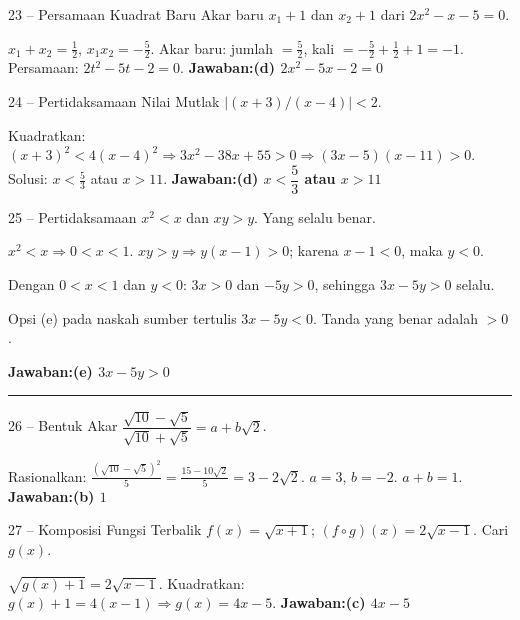 \documentclass[11pt]{article}
\newcommand{\jawaban}[1]{\textbf{Jawaban:}\enspace\colorbox{gold!30}{\textbf{#1}}}
\begin{document}
\begin{soal}{23 -- Persamaan Kuadrat Baru}
Akar baru $x_1+1$ dan $x_2+1$ dari $2x^2-x-5=0$.
\end{soal}
\begin{pembox}
$x_1+x_2=\frac12$, $x_1x_2=-\frac52$. Akar baru: jumlah $=\frac52$, kali $=-\frac52+\frac12+1=-1$.
Persamaan: $2t^2-5t-2=0$.
\jawaban{(d) $2x^2-5x-2=0$}
\end{pembox}

\begin{soal}{24 -- Pertidaksamaan Nilai Mutlak}
$|{(x+3)}/{(x-4)}|<2$.
\end{soal}
\begin{pembox}
Kuadratkan: $(x+3)^2<4(x-4)^2\Rightarrow3x^2-38x+55>0\Rightarrow(3x-5)(x-11)>0$.
Solusi: $x<\frac53$ atau $x>11$.
\jawaban{(d) $x<\dfrac53$ atau $x>11$}
\end{pembox}

\begin{soal}{25 -- Pertidaksamaan}
$x^2<x$ dan $xy>y$. Yang selalu benar.
\end{soal}
\begin{pembox}
$x^2<x\Rightarrow0<x<1$. $xy>y\Rightarrow y(x-1)>0$; karena $x-1<0$, maka $y<0$.

Dengan $0<x<1$ dan $y<0$: $3x>0$ dan $-5y>0$, sehingga $3x-5y>0$ selalu.
\begin{catatan}
Opsi (e) pada naskah sumber tertulis $3x-5y<0$. Tanda yang benar adalah $>0$.
\end{catatan}
\jawaban{(e) $3x-5y>0$}
\end{pembox}

\smallskip\hrule\medskip

\begin{soal}{26 -- Bentuk Akar}
$\dfrac{\sqrt{10}-\sqrt5}{\sqrt{10}+\sqrt5}=a+b\sqrt2$.
\end{soal}
\begin{pembox}
Rasionalkan: $\frac{(\sqrt{10}-\sqrt5)^2}{5}=\frac{15-10\sqrt2}{5}=3-2\sqrt2$.
$a=3$, $b=-2$. $a+b=1$.
\jawaban{(b) $1$}
\end{pembox}

\begin{soal}{27 -- Komposisi Fungsi Terbalik}
$f(x)=\sqrt{x+1}$; $(f\circ g)(x)=2\sqrt{x-1}$. Cari $g(x)$.
\end{soal}
\begin{pembox}
$\sqrt{g(x)+1}=2\sqrt{x-1}$. Kuadratkan: $g(x)+1=4(x-1)\Rightarrow g(x)=4x-5$.
\jawaban{(c) $4x-5$}
\end{pembox}
\end{document}
